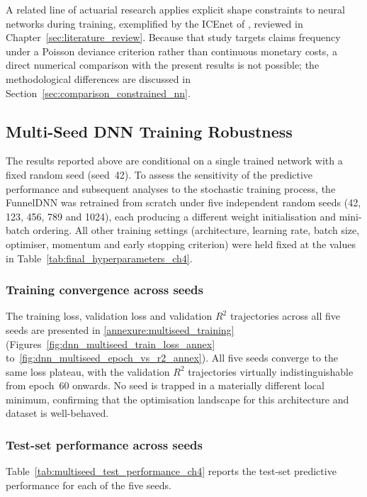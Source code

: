 A related line of actuarial research applies explicit shape constraints
to neural networks during training, exemplified by the ICEnet of
\citet{richman2024icenet}, reviewed in
Chapter~\ref{sec:literature_review}.  Because that study targets claims frequency
under a Poisson deviance criterion rather than continuous monetary costs,
a direct numerical comparison with the present results is not possible;
the methodological differences are discussed in
Section~\ref{sec:comparison_constrained_nn}.


\subsection{Multi-Seed DNN Training Robustness}
\label{sec:multiseed_dnn}

The results reported above are conditional on a single trained network
with a fixed random seed (seed~42).  To assess the sensitivity of the
predictive performance and subsequent analyses to the stochastic
training process, the FunnelDNN was retrained from scratch under five
independent random seeds (42, 123, 456, 789 and 1024), each producing a
different weight initialisation and mini-batch ordering.  All other
training settings (architecture, learning rate, batch size, optimiser,
momentum and early stopping criterion) were held fixed at the values in
Table~\ref{tab:final_hyperparameters_ch4}.

\subsubsection{Training convergence across seeds}

The training loss, validation loss and validation $R^2$ trajectories
across all five seeds are presented in
\ref{annexure:multiseed_training}
(Figures~\ref{fig:dnn_multiseed_train_loss_annex}
to~\ref{fig:dnn_multiseed_epoch_vs_r2_annex}).  All five seeds converge
to the same loss plateau, with the validation $R^2$ trajectories
virtually indistinguishable from epoch~60 onwards.  No seed is trapped
in a materially different local minimum, confirming that the optimisation
landscape for this architecture and dataset is well-behaved.

\subsubsection{Test-set performance across seeds}

Table~\ref{tab:multiseed_test_performance_ch4} reports the test-set
predictive performance for each of the five seeds.

